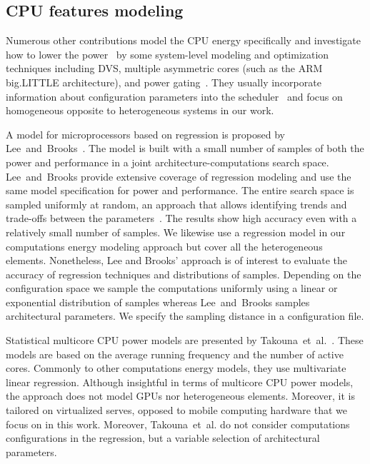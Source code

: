 \subsection{CPU features modeling}
\label{sec:soa-cpu}

Numerous other contributions model the CPU energy specifically and investigate how to lower the power~\citep{hong1999power, luo2001battery, chowdhury2005static} by some system-level modeling and optimization techniques including DVS, multiple asymmetric cores (such as the ARM big.LITTLE architecture), and power gating~\citep{walker2017accurate}. They usually incorporate information about configuration parameters into the scheduler~\citep{seewald2019coarse} and focus on homogeneous opposite to heterogeneous systems in our work. 

A model for microprocessors based on regression is proposed by Lee~and~Brooks~\citep{lee2006statistically,lee2006accurate}. The model is built with a small number of samples of both the power and performance in a joint architecture-computations search space. Lee~and~Brooks provide extensive coverage of regression modeling and use the same model specification for power and performance. The entire search space is sampled uniformly at random, an approach that allows identifying trends and trade-offs between the parameters~\citep{lee2006accurate}. The results show high accuracy even with a relatively small number of samples. We likewise use a regression model in our computations energy modeling approach but cover all the heterogeneous elements. Nonetheless, Lee and Brooks' approach is of interest to evaluate the accuracy of regression techniques and distributions of samples. Depending on the configuration space we sample the computations uniformly using a linear or exponential distribution of samples whereas Lee~and~Brooks samples architectural parameters. We specify the sampling distance in a configuration file. 

Statistical multicore CPU power models are presented by Takouna~et~al.~\citep{takouna2011accurate}. These models are based on the average running frequency and the number of active cores. Commonly to other computations energy models, they use multivariate linear regression. Although insightful in terms of multicore CPU power models, the approach does not model GPUs nor heterogeneous elements. Moreover, it is tailored on virtualized serves, opposed to mobile computing hardware that we focus on in this work. Moreover, Takouna~et~al. do not consider computations configurations in the regression, but a variable selection of architectural parameters. 

